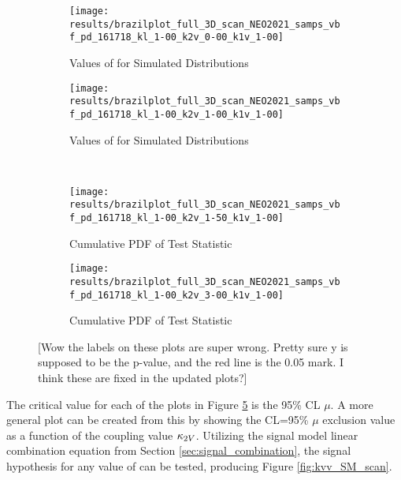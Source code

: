     \begin{figure}
        \centering
        \begin{subfigure}{0.48\textwidth} 
            \texttt{[image: results/brazilplot\_full\_3D\_scan\_NEO2021\_samps\_vbf\_pd\_161718\_kl\_1-00\_k2v\_0-00\_k1v\_1-00]}
            \caption{Values of \qtil for Simulated Distributions}
            \label{fig:mu_CL_k2v0}
        \end{subfigure}
        \begin{subfigure}{0.48\textwidth} 
            \texttt{[image: results/brazilplot\_full\_3D\_scan\_NEO2021\_samps\_vbf\_pd\_161718\_kl\_1-00\_k2v\_1-00\_k1v\_1-00]}
            \caption{Values of \qtil for Simulated Distributions}
            \label{fig:mu_CL_k2v1}
        \end{subfigure} \\
        \begin{subfigure}{0.48\textwidth}
            \texttt{[image: results/brazilplot\_full\_3D\_scan\_NEO2021\_samps\_vbf\_pd\_161718\_kl\_1-00\_k2v\_1-50\_k1v\_1-00]}
            \caption{Cumulative PDF of \qtil Test Statistic}
            \label{fig:mu_CL_k2v1.5}
        \end{subfigure}
        \begin{subfigure}{0.48\textwidth}
            \texttt{[image: results/brazilplot\_full\_3D\_scan\_NEO2021\_samps\_vbf\_pd\_161718\_kl\_1-00\_k2v\_3-00\_k1v\_1-00]}
            \caption{Cumulative PDF of \qtil Test Statistic}
            \label{fig:mu_CL_k2v3}
        \end{subfigure}
        \caption{
            [Wow the labels on these plots are super wrong. Pretty sure y is supposed to be the p-value,
                and the red line is the 0.05 mark. I think these are fixed in the updated plots?]
        }\label{fig:mu_CL_vals}
    \end{figure}

    \FloatBarrier
    The critical value for each of the plots in Figure \ref{fig:mu_CL_vals} is the 95\% CL $\mu$.
    A more general plot can be created from this by showing the CL=95\% $\mu$
        exclusion value as a function of the coupling value $\kappa_{2V}$.
    Utilizing the signal model linear combination equation from Section \ref{sec:signal_combination},
        the signal hypothesis for any value of \kvv can be tested, producing Figure \ref{fig:kvv_SM_scan}.


